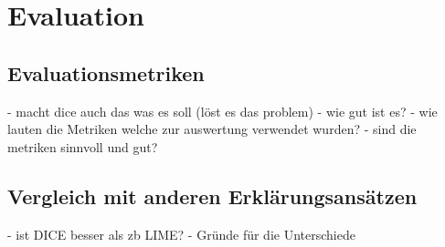 \chapter{Evaluation}

\section{Evaluationsmetriken}
- macht dice auch das was es soll (löst es das problem)
- wie gut ist es?
- wie lauten die Metriken welche zur auswertung verwendet wurden?
- sind die metriken sinnvoll und gut?

\section{Vergleich mit anderen Erklärungsansätzen}
- ist DICE besser als zb LIME?
- Gründe für die Unterschiede

